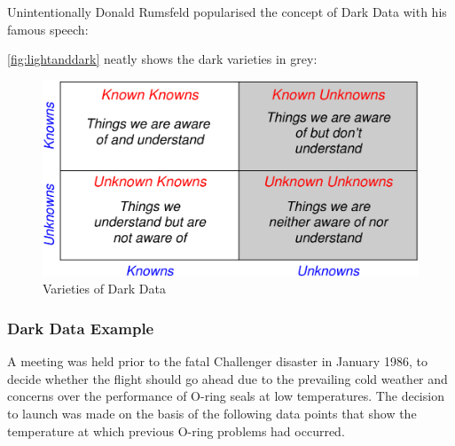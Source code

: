 Unintentionally Donald Rumsfeld popularised the concept of Dark Data with his famous speech:

\begin{quote}
\end{quote}

\autoref{fig:lightanddark} neatly shows the dark varieties in grey:

\begin{figure}[htbp]
  \centering
  \includegraphics[width=\textwidth/2]{images/darkknowns.pdf}
  \caption{Varieties of Dark Data}
  \label{fig:lightanddark}
\end{figure}

\subsubsection{Dark Data Example}
A meeting was held prior to the fatal Challenger disaster in January 1986, to decide whether the flight should go ahead due to the prevailing cold weather and concerns over the performance of O-ring seals at low temperatures. The decision to launch was made on the basis of the following data points that show the temperature at which previous O-ring problems had occurred.


